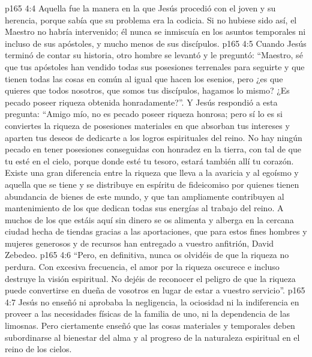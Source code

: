 \vs p165 4:4 \pc Aquella fue la manera en la que Jesús procedió con el joven y su herencia, porque sabía que su problema era la codicia. Si no hubiese sido así, el Maestro no habría intervenido; él nunca se inmiscuía en los asuntos temporales ni incluso de sus apóstoles, y mucho menos de sus discípulos.
\vs p165 4:5 Cuando Jesús terminó de contar su historia, otro hombre se levantó y le preguntó: “Maestro, sé que tus apóstoles han vendido todas sus posesiones terrenales para seguirte y que tienen todas las cosas en común al igual que hacen los esenios, pero ¿es que quieres que todos nosotros, que somos tus discípulos, hagamos lo mismo? ¿Es pecado poseer riqueza obtenida honradamente?”. Y Jesús respondió a esta pregunta: “Amigo mío, no es pecado poseer riqueza honrosa; pero sí lo es si conviertes la riqueza de posesiones materiales en  que absorban tus intereses y aparten tus deseos de dedicarte a los logros espirituales del reino. No hay ningún pecado en tener posesiones conseguidas con honradez en la tierra, con tal de que tu  esté en el cielo, porque donde esté tu tesoro, estará también allí tu corazón. Existe una gran diferencia entre la riqueza que lleva a la avaricia y al egoísmo y aquella que se tiene y se distribuye en espíritu de fideicomiso por quienes tienen abundancia de bienes de este mundo, y que tan ampliamente contribuyen al mantenimiento de los que dedican todas sus energías al trabajo del reino. A muchos de los que estáis aquí sin dinero se os alimenta y alberga en la cercana ciudad hecha de tiendas gracias a las aportaciones, que para estos fines hombres y mujeres generosos y de recursos han entregado a vuestro anfitrión, David Zebedeo.
\vs p165 4:6 “Pero, en definitiva, nunca os olvidéis de que la riqueza no perdura. Con excesiva frecuencia, el amor por la riqueza oscurece e incluso destruye la visión espiritual. No dejéis de reconocer el peligro de que la riqueza puede convertirse en dueña de vosotros en lugar de estar a vuestro servicio”.
\vs p165 4:7 \pc Jesús no enseñó ni aprobaba la negligencia, la ociosidad ni la indiferencia en proveer a las necesidades físicas de la familia de uno, ni la dependencia de las limosnas. Pero ciertamente enseñó que las cosas materiales y temporales deben subordinarse al bienestar del alma y al progreso de la naturaleza espiritual en el reino de los cielos.
